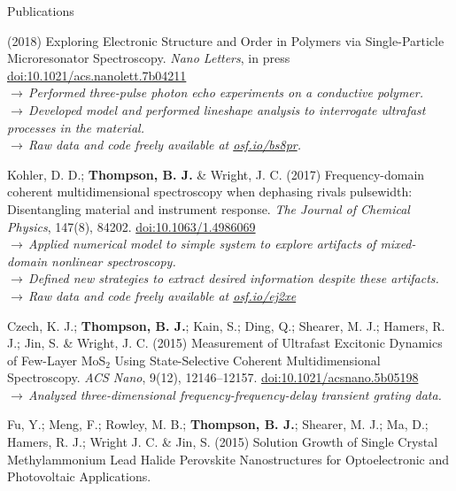 \documentclass{resume}  %
\begin{document}
\begin{rSection}{Publications}
\begin{etaremune}[leftmargin = 1.75em]
      (2018)
      Exploring Electronic Structure and Order in Polymers via Single-Particle Microresonator
      Spectroscopy.
      \textit{Nano Letters}, in press
      \href{https://doi.org/10.1021/acs.nanolett.7b04211}{doi:10.1021/acs.nanolett.7b04211} \\
      $\rightarrow\,$\textit{Performed three-pulse photon echo experiments on a conductive
        polymer.} \\
      $\rightarrow\,$\textit{Developed model and performed lineshape analysis to interrogate
        ultrafast processes in the material.} \\
      $\rightarrow\,$\textit{Raw data and code freely available at
        \href{https://osf.io/bs8pr/}{osf.io/bs8pr}.}
    \item Kohler, D. D.; \textbf{Thompson, B. J.} \& Wright, J. C.
      (2017)
      Frequency-domain coherent multidimensional spectroscopy when dephasing rivals pulsewidth:
      Disentangling material and instrument response.
      \textit{The Journal of Chemical Physics}, 147(8), 84202.
      \href{https://doi.org/10.1063/1.4986069}{doi:10.1063/1.4986069} \\
      $\rightarrow\,$\textit{Applied numerical model to simple system to explore artifacts of
        mixed-domain nonlinear spectroscopy.} \\
      $\rightarrow\,$\textit{Defined new strategies to extract desired information despite these
        artifacts.} \\
      $\rightarrow\,$\textit{Raw data and code freely available at
        \href{https://osf.io/ej2xe/}{osf.io/ej2xe}}
    \item Czech, K. J.; \textbf{Thompson, B. J.}; Kain, S.; Ding, Q.; Shearer, M. J.; Hamers,
      R. J.; Jin, S. \& Wright, J. C.
      (2015)
      Measurement of Ultrafast Excitonic Dynamics of Few-Layer MoS$_2$ Using State-Selective
      Coherent Multidimensional Spectroscopy.
      \textit{ACS Nano}, 9(12), 12146–12157.
      \href{https://doi.org/10.1021/acsnano.5b05198}{doi:10.1021/acsnano.5b05198} \\
      $\rightarrow\,$\textit{Analyzed three-dimensional frequency-frequency-delay transient grating
        data.}
    \item Fu, Y.; Meng, F.; Rowley, M. B.; \textbf{Thompson, B. J.}; Shearer, M. J.;
      Ma, D.; Hamers, R. J.; Wright J. C. \& Jin, S.
      (2015)
      Solution Growth of Single Crystal Methylammonium Lead Halide Perovskite Nanostructures for
      Optoelectronic and Photovoltaic Applications.

\end{etaremune}
\end{rSection}
\end{document}
